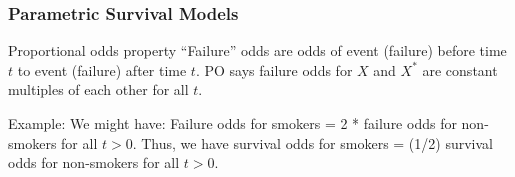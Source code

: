 \documentclass{beamer}
\theoremstyle{definition}
\begin{document}
\begin{frame}
\frametitle{Parametric Survival Models}
\begin{block}{Proportional odds property}
``Failure'' odds are odds of event (failure) before time $t$ to event (failure) after time $t$. PO says failure odds for $X$ and $X^*$ are constant multiples of each other for all $t$.
\vspace{10pt}

Example: We might have: Failure odds for smokers = 2 * failure odds for non-smokers for all $t>0$. Thus, we have survival odds for smokers = (1/2) survival odds for non-smokers for all $t>0$.
\end{block}
\end{frame}
\end{document}
